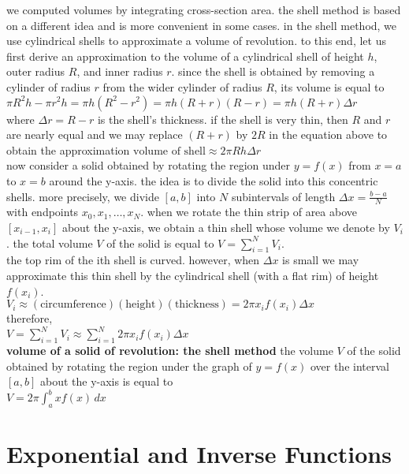 \documentclass{article}
\begin{document}
we computed volumes by integrating cross-section area. the shell method is based on a different idea and is more convenient in some cases. in the shell method, we use cylindrical shells to approximate a volume of revolution. to this end, let us first derive an approximation to the volume of a cylindrical shell of height $h$, outer radius $R$, and inner radius $r$. since the shell is obtained by removing a cylinder of radius $r$ from the wider cylinder of radius $R$, its volume is equal to\\ $\pi R^2h - \pi r^2h = \pi h(R^2 - r^2) = \pi h(R + r)(R - r) = \pi h(R + r)\Delta r$\\ where $\Delta r = R - r$ is the shell's thickness. if the shell is very thin, then $R$ and $r$ are nearly equal and we may replace $(R + r)$ by $2R$ in the equation above to obtain the approximation $\text{volume of shell} \approx 2\pi Rh\Delta r$\\

now consider a solid obtained by rotating the region under $y = f(x)$ from $x = a$ to $x = b$ around the y-axis. the idea is to divide the solid into this concentric shells. more precisely, we divide $[a, b]$ into $N$ subintervals of length $\Delta x = \frac{b - a}{N}$ with endpoints $x_0, x_1, \ldots, x_N$. when we rotate the thin strip of area above $[x_{i - 1}, x_i]$ about the y-axis, we obtain a thin shell whose volume we denote by $V_i$. the total volume $V$ of the solid is equal to $V = \sum_{i=1}^{N}V_i$.\\

the top rim of the ith shell is curved. however, when $\Delta x$ is small we may approximate this thin shell by the cylindrical shell (with a flat rim) of height $f(x_i)$.\\ $V_i \approx (\text{circumference})(\text{height})(\text{thickness}) = 2\pi x_if(x_i)\Delta x$\\ therefore,\\ $V = \sum_{i=1}^{N}V_i \approx \sum_{i=1}^{N}2\pi x_if(x_i)\Delta x$\\

\textbf{volume of a solid of revolution: the shell method} the volume $V$ of the solid obtained by rotating the region under the graph of $y = f(x)$ over the interval $[a, b]$ about the y-axis is equal to\\ $V = 2\pi \int_{a}^{b}xf(x)\,dx$\\

\section*{Exponential and Inverse Functions}
\end{document}
